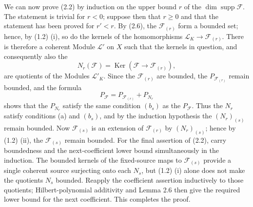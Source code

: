 We can now prove (2.2) by induction on the upper bound $r$ of the
$\dim\operatorname{supp}\mathcal F$. The statement is trivial for $r<0$;
suppose then that $r\geq0$ and that the statement has been proved for $r'<r$.
By (2.6), the $\mathcal F_{(r)}$ form a bounded set; hence, by (1.2) (i), so do
the kernels of the homomorphisms
$\mathcal L_K\longrightarrow\mathcal F_{(r)}$. There is therefore a coherent
Module $\mathcal L'$ on $X$ such that the kernels in question, and consequently
also the
\[
N_r(\mathcal F)=\operatorname{Ker}(\mathcal F\longrightarrow\mathcal F_{(r)}),
\]
are quotients of the Modules $\mathcal L'_K$. Since the $\mathcal F_{(r)}$ are
bounded, the $P_{\mathcal F_{(r)}}$ remain bounded, and the formula
\[
P_{\mathcal F}=P_{\mathcal F_{(r)}}+P_{N_r}
\]
shows that the $P_{N_r}$ satisfy the same condition $(b_s)$ as the
$P_{\mathcal F}$. Thus the $N_r$ satisfy conditions (a) and $(b_s)$, and by
the induction hypothesis the $(N_r)_{(s)}$ remain bounded. Now
$\mathcal F_{(s)}$ is an extension of $\mathcal F_{(r)}$ by
$(N_r)_{(s)}$; hence by (1.2) (ii), the $\mathcal F_{(s)}$ remain bounded. For the final assertion of (2.2), carry boundedness and the next-coefficient lower bound simultaneously in the induction. The bounded kernels of the fixed-source maps to $\mathcal F_{(s)}$ provide a single coherent source surjecting onto each $N_s$, but (1.2) (i) alone does not make the quotients $N_s$ bounded. Reapply the coefficient assertion inductively to those quotients; Hilbert-polynomial additivity and Lemma 2.6 then give the required lower bound for the next coefficient.
This completes the proof.



